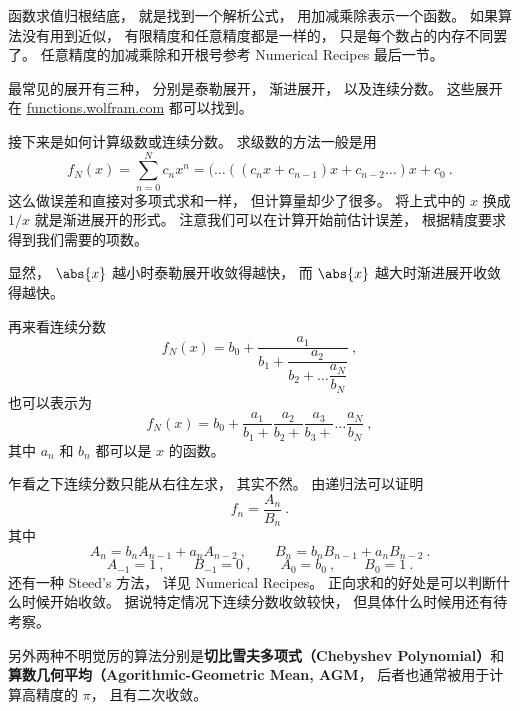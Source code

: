 
函数求值归根结底， 就是找到一个解析公式， 用加减乘除表示一个函数。 如果算法没有用到近似， 有限精度和任意精度都是一样的， 只是每个数占的内存不同罢了。 任意精度的加减乘除和开根号参考 Numerical Recipes 最后一节。

最常见的展开有三种， 分别是泰勒展开， 渐进展开， 以及连续分数。 这些展开在 \href{http://functions.wolfram.com}{functions.wolfram.com} 都可以找到。

接下来是如何计算级数或连续分数。 求级数的方法一般是用
\begin{equation}
f_N(x) = \sum_{n = 0}^N c_n x^n = (\dots ((c_n x + c_{n-1})x + c_{n-2} \dots )x + c_0~.
\end{equation}
这么做误差和直接对多项式求和一样， 但计算量却少了很多。 将上式中的 $x$ 换成 $1/x$ 就是渐进展开的形式。 注意我们可以在计算开始前估计误差， 根据精度要求得到我们需要的项数。

显然， $\abs{x}$ 越小时泰勒展开收敛得越快， 而 $\abs{x}$ 越大时渐进展开收敛得越快。

再来看连续分数
\begin{equation}
f_N(x) = b_0 + \dfrac{a_1}{b_1 + \dfrac{a_2}{b_2 + \dots \dfrac{a_N}{b_N}}}~,
\end{equation}
也可以表示为
\begin{equation}
f_N(x) = b_0 + \frac{a_1}{b_1 +} \frac{a_2}{b_2 +} \frac{a_3}{b_3 +} \dots \frac{a_N}{b_N}~,
\end{equation}
其中 $a_n$ 和 $b_n$ 都可以是 $x$ 的函数。

乍看之下连续分数只能从右往左求， 其实不然。 由递归法可以证明
\begin{equation}
f_n = \frac{A_n}{B_n}~.
\end{equation}
其中
\begin{equation}
A_n = b_n A_{n-1} + a_n A_{n-2} ~,\qquad
B_n = b_n B_{n-1} + a_n B_{n-2}~.
\end{equation}
\begin{equation}
A_{-1} = 1 ~,\qquad B_{-1} = 0~,
\qquad A_0 = b_0 ~,\qquad B_0 = 1~.
\end{equation}
还有一种 Steed's 方法， 详见 Numerical Recipes。 正向求和的好处是可以判断什么时候开始收敛。
据说特定情况下连续分数收敛较快， 但具体什么时候用还有待考察。

另外两种不明觉厉的算法分别是\textbf{切比雪夫多项式（Chebyshev Polynomial）}和\textbf{算数几何平均（Agorithmic-Geometric Mean, AGM}， 后者也通常被用于计算高精度的 $\pi$， 且有二次收敛。
